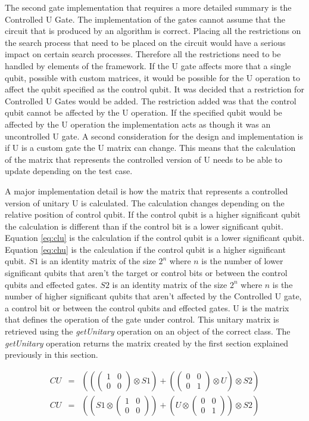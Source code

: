 The second gate implementation that requires a more detailed summary is the Controlled U Gate.
The implementation of the gates cannot assume that the circuit that is produced by an algorithm is correct.
Placing all the restrictions on the search process that need to be placed on the circuit would have a serious impact on certain search processes.
Therefore all the restrictions need to be handled by elements of the framework.
If the U gate affects more that a single qubit, possible with custom matrices, it would be possible for the U operation to affect the qubit specified as the control qubit.
It was decided that a restriction for Controlled U Gates would be added.
The restriction added was that the control qubit cannot be affected by the U operation.
If the specified qubit would be affected by the U operation the implementation acts as though it was an uncontrolled U gate.
A second consideration for the design and implementation is if U is a custom gate the U matrix can change.
This means that the calculation of the matrix that represents the controlled version of U needs to be able to update depending on the test case.

A major implementation detail is how the matrix that represents a controlled version of unitary U is calculated.
The calculation changes depending on the relative position of control qubit.
If the control qubit is a higher significant qubit the calculation is different than if the control bit is a lower significant qubit.
Equation \ref{eq:clu} is the calculation if the control qubit is a lower significant qubit.
Equation \ref{eq:chu} is the calculation if the control qubit is a higher significant qubit.
$S1$ is an identity matrix of the size $2^n$ where $n$ is the number of lower significant qubits that aren't the target or control bits or between the control qubits and effected gates.
$S2$ is an identity matrix of the size $2^n$ where $n$ is the number of higher significant qubits that aren't affected by the Controlled U gate, a control bit or between the control qubits and effected gates.
U is the matrix that defines the operation of the gate under control.
This unitary matrix is retrieved using the \emph{getUnitary} operation on an object of the correct class.
The \emph{getUnitary} operation returns the matrix created by the first section explained previously in this section.

\begin{eqnarray}
\label{eq:clu}
 CU&=& ((\begin{pmatrix}1&0\\0&0\end{pmatrix}\otimes S1)+(\begin{pmatrix}0&0\\0&1\end{pmatrix}\otimes U) \otimes S2) \\
\label{eq:chu}
 CU&=& (( S1 \otimes \begin{pmatrix}1&0\\0&0\end{pmatrix})+(U \otimes \begin{pmatrix}0&0\\0&1\end{pmatrix}) \otimes S2)
\end{eqnarray}


